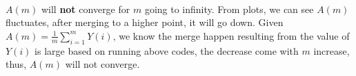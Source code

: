 \documentclass[12pt]{article}
\theoremstyle{remark}
\theoremstyle{definition}
\numberwithin{figure}{section}
\begin{document}
\begin{enumerate}[\textbf{4.}]
\\
 $A(m)$ will \textbf{not} converge for $m$ going to infinity. From plots, we can see $A(m)$ fluctuates, after merging to a higher point, it will go down. Given $A(m) = \frac{1}{m}\sum_{i=1}^{m}Y(i)$, we know the merge happen resulting from the value of $Y(i)$ is large based on running above codes, the decrease come with $m$ increase, thus, $A(m)$ will not converge.  
\end{enumerate}
\end{document}

